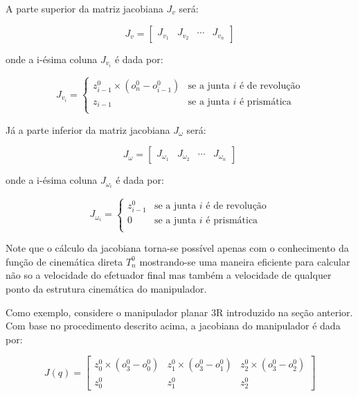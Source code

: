 A parte superior da matriz jacobiana \(J_v\) será:

\begin{equation}
    J_v = \begin{bmatrix}
        J_{v_1} & J_{v_2} & \cdots & J_{v_n}
    \end{bmatrix}
\end{equation}

onde a i-ésima coluna \(J_{v_i}\) é dada por:

\begin{equation}
    J_{v_i} =
    \begin{cases}
        z_{i-1}^0 \times (o_n^0 - o_{i-1}^0) & \text{se a junta $i$ é de revolução} \\
        z_{i-1}                              & \text{se a junta $i$ é prismática}   \\
    \end{cases}
\end{equation}

Já a parte inferior da matriz jacobiana \(J_\omega\) será:

\begin{equation}
    J_\omega = \begin{bmatrix}
        J_{\omega_1} & J_{\omega_2} & \cdots & J_{\omega_n}
    \end{bmatrix}
\end{equation}

onde a i-ésima coluna \(J_{\omega_i}\) é dada por:

\begin{equation}
    J_{\omega_i} =
    \begin{cases}
        z_{i-1}^0 & \text{se a junta $i$ é de revolução} \\
        0         & \text{se a junta $i$ é prismática}   \\
    \end{cases}
\end{equation}

Note que o cálculo da jacobiana torna-se possível apenas com o conhecimento da
função de cinemática direta \(T_n^0\) mostrando-se uma maneira eficiente para calcular 
não so a velocidade do efetuador final mas também a velocidade de qualquer ponto da 
estrutura cinemática do manipulador.

Como exemplo, considere o manipulador planar 3R introduzido na seção anterior.
Com base no procedimento descrito acima, a jacobiana do manipulador é dada por:

\begin{equation}
    J(q) = \begin{bmatrix}
        z_0^0 \times (o_3^0 - o_0^0) & z_1^0 \times (o_3^0 - o_1^0) & z_2^0 \times (o_3^0 - o_2^0) \\
        z_0^0                        & z_1^0                        & z_2^0
    \end{bmatrix}
\end{equation}

